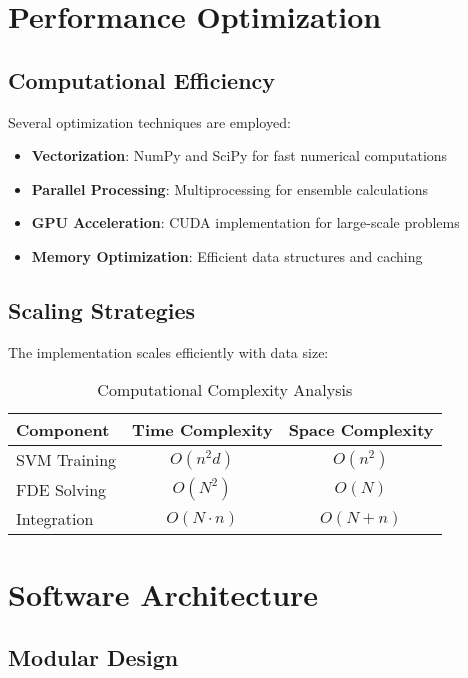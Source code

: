 \documentclass[12pt,a4paper]{report}
\begin{document}
\section{Performance Optimization}

\subsection{Computational Efficiency}

Several optimization techniques are employed:

\begin{itemize}
    \item \textbf{Vectorization}: NumPy and SciPy for fast numerical computations
    \item \textbf{Parallel Processing}: Multiprocessing for ensemble calculations
    \item \textbf{GPU Acceleration}: CUDA implementation for large-scale problems
    \item \textbf{Memory Optimization}: Efficient data structures and caching
\end{itemize}

\subsection{Scaling Strategies}

The implementation scales efficiently with data size:

\begin{table}[H]
\centering
\caption{Computational Complexity Analysis}
\begin{tabular}{lcc}
\toprule
Component & Time Complexity & Space Complexity \\
\midrule
SVM Training & $O(n^2d)$ & $O(n^2)$ \\
FDE Solving & $O(N^2)$ & $O(N)$ \\
Integration & $O(N \cdot n)$ & $O(N + n)$ \\
\bottomrule
\end{tabular}
\end{table}

\section{Software Architecture}

\subsection{Modular Design}
\end{document}
